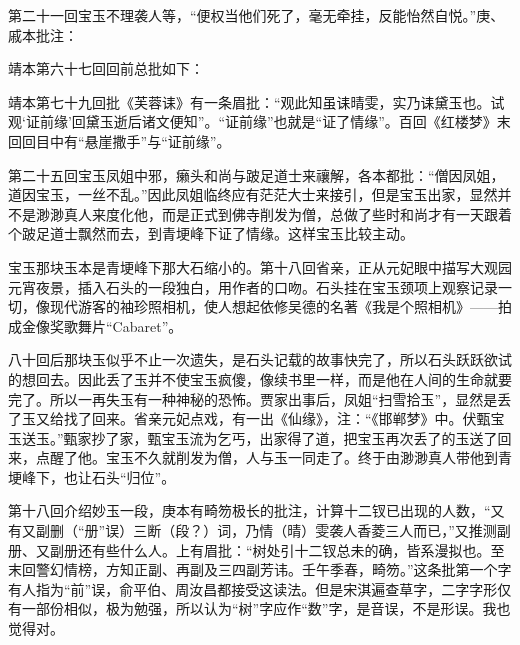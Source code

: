 \par 第二十一回宝玉不理袭人等，“便权当他们死了，毫无牵挂，反能怡然自悦。”庚、戚本批注：
\par 靖本第六十七回回前总批如下：
\par 靖本第七十九回批《芙蓉诔》有一条眉批：“观此知虽诔晴雯，实乃诔黛玉也。试观‘证前缘’回黛玉逝后诸文便知”。“证前缘”也就是“证了情缘”。百回《红楼梦》末回回目中有“悬崖撒手”与“证前缘”。
\par 第二十五回宝玉凤姐中邪，癞头和尚与跛足道士来禳解，各本都批：“僧因凤姐，道因宝玉，一丝不乱。”因此凤姐临终应有茫茫大士来接引，但是宝玉出家，显然并不是渺渺真人来度化他，而是正式到佛寺削发为僧，总做了些时和尚才有一天跟着个跛足道士飘然而去，到青埂峰下证了情缘。这样宝玉比较主动。
\par 宝玉那块玉本是青埂峰下那大石缩小的。第十八回省亲，正从元妃眼中描写大观园元宵夜景，插入石头的一段独白，用作者的口吻。石头挂在宝玉颈项上观察记录一切，像现代游客的袖珍照相机，使人想起依修吴德的名著《我是个照相机》——拍成金像奖歌舞片“Cabaret”。
\par 八十回后那块玉似乎不止一次遗失，是石头记载的故事快完了，所以石头跃跃欲试的想回去。因此丢了玉并不使宝玉疯傻，像续书里一样，而是他在人间的生命就要完了。所以一再失玉有一种神秘的恐怖。贾家出事后，凤姐“扫雪拾玉”，显然是丢了玉又给找了回来。省亲元妃点戏，有一出《仙缘》，注：“《邯郸梦》中。伏甄宝玉送玉。”甄家抄了家，甄宝玉流为乞丐，出家得了道，把宝玉再次丢了的玉送了回来，点醒了他。宝玉不久就削发为僧，人与玉一同走了。终于由渺渺真人带他到青埂峰下，也让石头“归位”。
\par 第十八回介绍妙玉一段，庚本有畸笏极长的批注，计算十二钗已出现的人数，“又有又副删（“册”误）三断（段？）词，乃情（晴）雯袭人香菱三人而已，”又推测副册、又副册还有些什么人。上有眉批：“树处引十二钗总未的确，皆系漫拟也。至末回警幻情榜，方知正副、再副及三四副芳讳。壬午季春，畸笏。”这条批第一个字有人指为“前”误，俞平伯、周汝昌都接受这读法。但是宋淇遍查草字，二字字形仅有一部份相似，极为勉强，所以认为“树”字应作“数”字，是音误，不是形误。我也觉得对。
